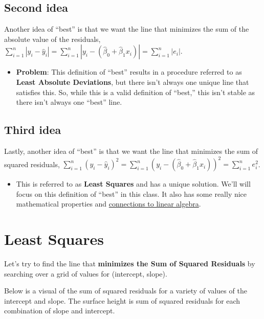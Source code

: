 \documentclass[
]{book}
\providecommand{\tightlist}{%
  \setlength{\itemsep}{0pt}\setlength{\parskip}{0pt}}
\begin{document}
\hypertarget{second-idea}{%
\subsection{Second idea}\label{second-idea}}

Another idea of ``best'' is that we want the line that minimizes the sum of the absolute value of the residuals, \(\sum_{i=1}^n |y_i - \hat{y}_i| = \sum_{i=1}^n |y_i - ( \hat{\beta}_0 + \hat{\beta}_1x_i)| = \sum_{i=1}^n |e_i|\).

\begin{itemize}
\tightlist
\item
  \textbf{Problem}: This definition of ``best'' results in a procedure referred to as \textbf{Least Absolute Deviations}, but there isn't always one unique line that satisfies this. So, while this is a valid definition of ``best,'' this isn't stable as there isn't always one ``best'' line.
\end{itemize}

\hypertarget{third-idea}{%
\subsection{Third idea}\label{third-idea}}

Lastly, another idea of ``best'' is that we want the line that minimizes the sum of squared residuals, \(\sum_{i=1}^n (y_i - \hat{y}_i)^2= \sum_{i=1}^n(y_i-( \hat{\beta}_0 + \hat{\beta}_1x_i))^2=\sum_{i=1}^n e_i^2\).

\begin{itemize}
\tightlist
\item
  This is referred to as \textbf{Least Squares} and has a unique solution. We'll will focus on this definition of ``best'' in this class. It also has some really nice mathematical properties and \href{https://medium.com/@andrew.chamberlain/the-linear-algebra-view-of-least-squares-regression-f67044b7f39b}{connections to linear algebra}.
\end{itemize}

\hypertarget{least-squares}{%
\section{Least Squares}\label{least-squares}}

Let's try to find the line that \textbf{minimizes the Sum of Squared Residuals} by searching over a grid of values for (intercept, slope).

Below is a visual of the sum of squared residuals for a variety of values of the intercept and slope. The surface height is sum of squared residuals for each combination of slope and intercept.
\end{document}
